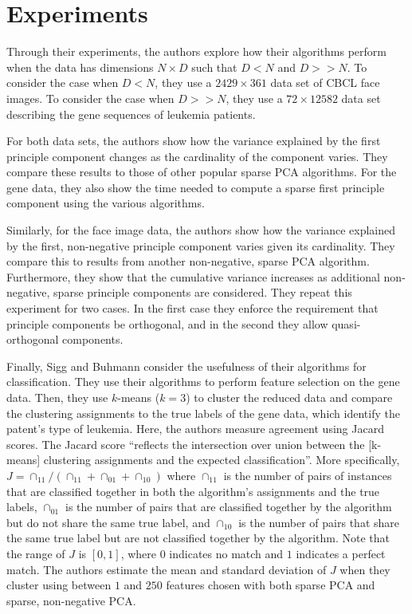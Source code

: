 \documentclass{article}
\begin{document}
\section{Experiments}

Through their experiments, the authors explore how their algorithms perform
when the data has dimensions $N \times D$ such that $D < N$ and $D >> N$.
To consider the case when $D < N$, they use a $2429 \times 361$ data set
of CBCL face images.
To consider the case when $D >> N$, they use a $72 \times 12582$ data set
describing the gene sequences of leukemia patients.

For both data sets, the authors show how the variance explained by the first
principle component changes as the cardinality of the component varies.
They compare these results to those of other popular sparse PCA algorithms.
For the gene data, they also show the time needed to compute a sparse
first principle component using the various algorithms.

Similarly, for the face image data, the authors show how the variance
explained by the first, non-negative principle component varies given
its cardinality.
They compare this to results from another non-negative, sparse PCA algorithm.
Furthermore, they show that the cumulative variance increases as additional
non-negative, sparse principle components are considered.
They repeat this experiment for two cases. In the first case they enforce
the requirement that principle components be orthogonal, and in the second
they allow quasi-orthogonal components.

Finally, Sigg and Buhmann consider the usefulness of their algorithms
for classification.
They use their algorithms to perform feature selection on the gene data.
Then, they use $k$-means ($k=3$) to cluster the reduced data
and compare the clustering assignments to the true labels of the gene data,
which identify the patent's type of leukemia.
Here, the authors measure agreement using Jacard scores.
The Jacard score ``reflects the intersection over union between the
[k-means] clustering assignments and the expected classification''.
More specifically, $J = \cap_{11} / (\cap_{11} + \cap_{01} + \cap_{10})$
where $\cap_{11}$ is the number of pairs of instances that are
classified together in both the algorithm's assignments and the true labels,
$\cap_{01}$ is the number of pairs that are classified together by the
algorithm but do not share the same true label, and $\cap_{10}$ is the
number of pairs that share the same true label but are not classified
together by the algorithm.
Note that the range of $J$ is $[0, 1]$, where $0$ indicates no match
and $1$ indicates a perfect match.
The authors estimate the mean and standard deviation of $J$ when they
cluster using
between $1$ and $250$ features chosen with both sparse PCA and
sparse, non-negative PCA.
\end{document}

